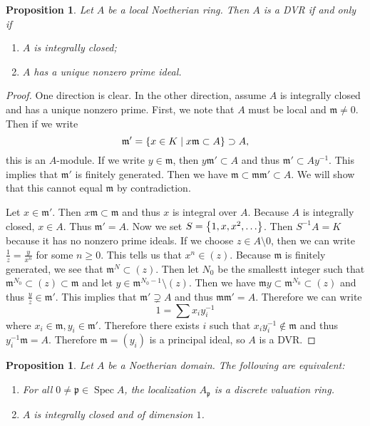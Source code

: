 \documentclass[leqno, openany]{memoir}
\newtheorem{prop}[thm]{Proposition}
\theoremstyle{definition}
\theoremstyle{remark}
\theoremstyle{plain}
\theoremstyle{definition}
\theoremstyle{remark}
\newcommand{\mf}[1]{\mathfrak{#1}}
\DeclareMathOperator{\Spec}{Spec}
\begin{document}
\begin{prop}
    Let $A$ be a local Noetherian ring. Then $A$ is a DVR if and only if 
    \begin{enumerate}
        \item $A$ is integrally closed;
        \item $A$ has a unique nonzero prime ideal.
    \end{enumerate}
\end{prop}

\begin{proof}
    One direction is clear. In the other direction, assume $A$ is integrally closed and has a unique nonzero prime. First, we note that $A$ must be local and $\mf{m} \neq 0$. Then if we write 
    \[ \mf{m}' = \qty{x \in K \mid x \mf{m} \subset A} \supset A, \] 
    this is an $A$-module. If we write $y \in \mf{m}$, then $y \mf{m}' \subset A$ and thus $\mf{m}' \subset Ay^{-1}$. This implies that $\mf{m}'$ is finitely generated. Then we have $\mf{m} \subset \mf{m} \mf{m}' \subset A$. We will show that this cannot equal $\mf{m}$ by contradiction. 

    Let $x \in \mf{m}'$. Then $x \mf{m} \subset \mf{m}$ and thus $x$ is integral over $A$. Because $A$ is integrally closed, $x \in A$. Thus $\mf{m}' = A$. Now we set $S = \qty{1, x, x^2, \ldots}$. Then $S^{-1}A = K$ because it has no nonzero prime ideals. If we choose $z \in A \setminus 0$, then we can write $\frac{1}{z} = \frac{y}{x^n}$ for some $n \geq 0$. This tells us that $x^n \in (z)$. Because $\mf{m}$ is finitely generated, we see that $\mf{m}^N \subset (z)$. Then let $N_0$ be the smallestt integer such that $\mf{m}^{N_0} \subset (z) \subset \mf{m}$ and let $y \in \mf{m}^{N_0 - 1} \setminus (z)$. Then we have $\mf{m}y \subset \mf{m}^{N_0} \subset (z)$ and thus $\frac{y}{z} \in \mf{m}'$. This implies that $\mf{m}' \supsetneq A$ and thus $\mf{m} \mf{m}' = A$. Therefore we can write
    \[ 1 = \sum x_i y_i^{-1} \]
    where $x_i \in \mf{m}, y_i \in \mf{m}'$. Therefore there exists $i$ such that $x_i y_i^{-1} \notin \mf{m}$ and thus $y_i^{-1} \mf{m} = A$. Therefore $\mf{m} = (y_i)$ is a principal ideal, so $A$ is a DVR.
\end{proof}

\begin{prop}
    Let $A$ be a Noetherian domain. The following are equivalent:
    \begin{enumerate}
        \item For all $0 \neq \mf{p} \in \Spec A$, the localization $A_{\mf{p}}$ is a discrete valuation ring.
        \item $A$ is integrally closed and of dimension $1$.
    \end{enumerate}
\end{prop}
\end{document}
